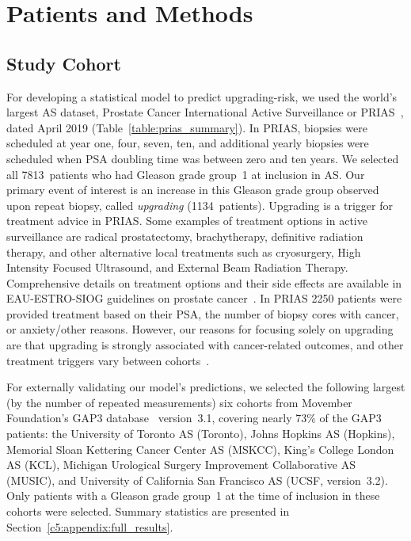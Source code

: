 \section{Patients and Methods}
\label{c5:sec:pat_methods}
\subsection{Study Cohort}
\label{subsec:cohort}
For developing a statistical model to predict upgrading-risk, we used the world's largest AS dataset, Prostate Cancer International Active Surveillance or PRIAS~\citep{bul2013active}, dated April 2019 (Table~\ref{table:prias_summary}). In PRIAS, biopsies were scheduled at year one, four, seven, ten, and additional yearly biopsies were scheduled when PSA doubling time was between zero and ten years. We selected all 7813~patients who had Gleason grade group~1 at inclusion in AS. Our primary event of interest is an increase in this Gleason grade group observed upon repeat biopsy, called \textit{upgrading} (1134~patients). Upgrading is a trigger for treatment advice in PRIAS. Some examples of treatment options in active surveillance are radical prostatectomy, brachytherapy, definitive radiation therapy, and other alternative local treatments such as cryosurgery, High Intensity Focused Ultrasound, and External Beam Radiation Therapy. Comprehensive details on treatment options and their side effects are available in EAU-ESTRO-SIOG guidelines on prostate cancer~\citep{mottet2017eau}. In PRIAS 2250 patients were provided treatment based on their PSA, the number of biopsy cores with cancer, or anxiety/other reasons. However, our reasons for focusing solely on upgrading are that upgrading is strongly associated with cancer-related outcomes, and other treatment triggers vary between cohorts~\citep{nieboer2018active}.

For externally validating our model's predictions, we selected the following largest (by the number of repeated measurements) six cohorts from Movember Foundation's GAP3 database~\citep{gap3_2018} version~3.1, covering nearly 73\% of the GAP3 patients: the University of Toronto AS (Toronto), Johns Hopkins AS (Hopkins), Memorial Sloan Kettering Cancer Center AS (MSKCC), King's College London AS (KCL), Michigan Urological Surgery Improvement Collaborative AS (MUSIC), and University of California San Francisco AS (UCSF, version~3.2). Only patients with a Gleason grade group~1 at the time of inclusion in these cohorts were selected. Summary statistics are presented in Section~\ref{c5:appendix:full_results}.

